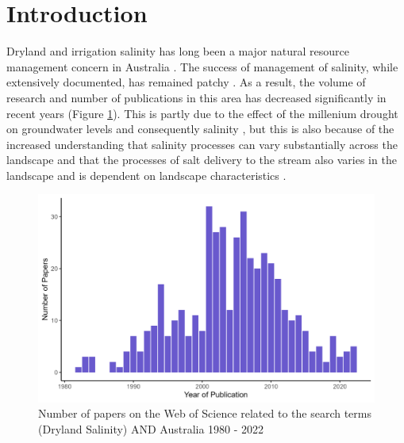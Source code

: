 \documentclass[, manuscript]{copernicus}
\begin{document}


\section{Introduction}

Dryland and irrigation salinity has long been a major natural resource
management concern in Australia
\citep{Jolly2001, White2009, Scanlon2007, Walker2002, Finlayson2010}.
The success of management of salinity, while extensively documented, has
remained patchy \citep{Leblanc2012}. As a result, the volume of research
and number of publications in this area has decreased significantly in
recent years (Figure \ref{fig:SalinityPapers}). This is partly due to
the effect of the millenium drought on groundwater levels and
consequently salinity \citep{Mcfarlane2016}, but this is also because of
the increased understanding that salinity processes can vary
substantially across the landscape \citep{Conyers2008} and that the
processes of salt delivery to the stream also varies in the landscape
\citep{Summerell2006, Hughes2007} and is dependent on landscape
characteristics \citep{vanDijk2008, Dalhaus2010}.

\begin{figure}
\includegraphics[width=0.9\linewidth]{Figures/Dryland Salinity Papers} \caption{Number of papers on the Web of Science related to the search terms (Dryland Salinity) AND Australia 1980 - 2022}\label{fig:SalinityPapers}
\end{figure}
\end{document}
